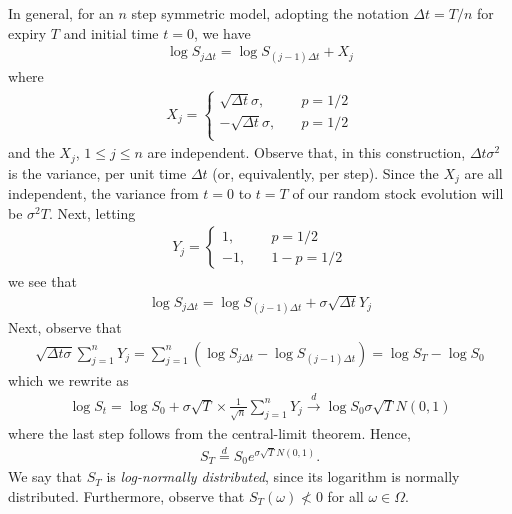 \documentclass[12pt]{article}
\theoremstyle{plain}
\theoremstyle{definition}
\theoremstyle{remark}
\numberwithin{equation}{section}  %
\begin{document}
In general, for an $n$ step symmetric model, adopting the notation $\Delta t =
T/n$ for expiry $T$ and initial time $t=0$, we have 
\begin{equation*}
\begin{split}
	\log S_{j \Delta t} = \log S_{(j-1) \Delta t} + X_{j}
\end{split}
\end{equation*}
where
\begin{equation*}
\begin{split}
	X_{j} = \begin{cases}
		\sqrt{\Delta t} \sigma, & \quad p = 1/2 \\
		 - \sqrt{\Delta t} \sigma, & \quad p = 1/2 \\
	\end{cases}
\end{split}
\end{equation*}
and the $X_{j}$, $1 \le j \le n$ are independent.
Observe that, in this construction, $\Delta t \sigma^2$ is the variance,
per unit time $\Delta t$ (or, equivalently, per step). 
Since the $X_{j}$ are all independent, the variance from $t=0$ to $t=T$
of our random stock evolution will be $\sigma^2 T$. Next,
letting
\begin{equation*}
\begin{split}
	Y_{j} = \begin{cases}
	1, & \quad p=1/2 \\
	-1, & \quad 1-p = 1/2
	\end{cases}
\end{split}
\end{equation*}
we see that
\begin{equation*}
\begin{split}
	\log S_{j \Delta t} = \log S_{(j-1) \Delta t} + \sigma \sqrt{\Delta t}Y_{j}
\end{split}
\end{equation*}
Next, observe that
\begin{equation*}
\begin{split}
	\sqrt{\Delta t \sigma} \sum_{j = 1}^{n} Y_{j} = 
	\sum _{j = 1}^{n} (\log S_{j \Delta t} - \log S_{(j-1) \Delta t})
	= \log S_{T} - \log S_{0}
\end{split}
\end{equation*}
which we rewrite as 
\begin{equation*}
\begin{split}
	\log S_{t} = \log S_{0} + \sigma \sqrt{T} \times \frac{1}{\sqrt{n}}
	\sum_{j=1}^{n} Y_{j} \xrightarrow{d} \log S_{0} \sigma \sqrt{T} N(0,1)
\end{split}
\end{equation*}
where the last step follows from the central-limit theorem.
Hence, 
\begin{equation*}
\begin{split}
	S_{T} \overset{d}{=} S_{0} e^{\sigma \sqrt{T}N(0,1)}.
\end{split}
\end{equation*}
We say that $S_{T}$ is \emph{log-normally distributed}, since its
logarithm is normally distributed. Furthermore, observe that
$S_{T}(\omega) \not < 0$ for all $\omega \in \Omega$.
\end{document}
